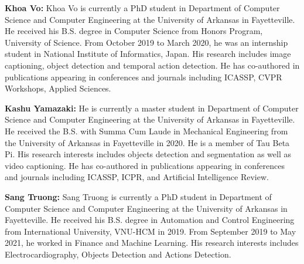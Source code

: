 \documentclass{ieeeaccess}
\begin{document}
{\small


}
\clearpage

\begin{IEEEbiography}{} \textbf{Khoa Vo: } Khoa Vo is currently a PhD student in  Department of Computer Science and Computer Engineering at the University of Arkansas in Fayetteville. He received his B.S. degree in Computer Science from Honors Program, University of Science. From October 2019 to March 2020, he was an internship student in National Institute of Informatics, Japan. His research includes image captioning, object detection and temporal action detection. He has co-authored in publications appearing in conferences and journals including ICASSP, CVPR Workshops, Applied Sciences.
\end{IEEEbiography}

\begin{IEEEbiography}{} \textbf{Kashu Yamazaki: } He is currently a master student in Department of Computer Science and Computer Engineering at the University of Arkansas in Fayetteville. He received the B.S. with Summa Cum Laude in Mechanical Engineering from the University of Arkansas in Fayetteville in 2020. He is a member of Tau Beta Pi. His research interests includes objects detection and segmentation as well as video captioning. He has co-authored in publications appearing in conferences and journals including ICASSP, ICPR, and Artificial Intelligence Review.
\end{IEEEbiography}

\begin{IEEEbiography}{} \textbf{Sang Truong: } Sang Truong is currently a PhD student in  Department of Computer Science and Computer Engineering at the University of Arkansas in Fayetteville. He received his B.S. degree in Automation and Control Engineering from International University, VNU-HCM in 2019. From September 2019 to May 2021, he worked in Finance and Machine Learning. His research interests includes Electrocardiography, Objects Detection and Actions Detection. 
\end{IEEEbiography}
\end{document}
